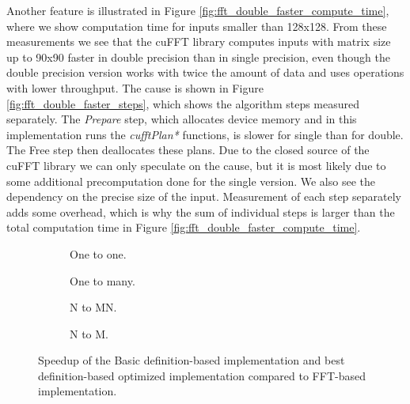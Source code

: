 Another feature is illustrated in Figure \ref{fig:fft_double_faster_compute_time}, where we show computation time for inputs smaller than 128x128. From these measurements we see that the cuFFT library computes inputs with matrix size up to 90x90
faster in double precision than in single precision, even though the  double precision version works with twice the amount of data and uses operations with lower throughput. The cause is shown in Figure \ref{fig:fft_double_faster_steps}, which shows the algorithm steps measured separately. The \textit{Prepare} step, which allocates device memory and in this implementation runs the \textit{cufftPlan*} functions, is slower for single than for double. The Free step then deallocates these plans. Due to the closed source of the cuFFT library we can only speculate on the cause, but it is most likely due to some additional precomputation done for the single version. We also see the dependency on the precise size of the input. Measurement of each step separately adds some overhead, which is why the sum of individual steps is larger than the total computation time in Figure \ref{fig:fft_double_faster_compute_time}.



\begin{figure}[ht]
	\centering	
	\begin{subfigure}{0.35\textwidth}
		\centering
		\def\svgwidth{\textwidth}
		
		\caption{One to one.}
		\label{fig:fft_speedup_one_to_one}
	\end{subfigure}
	\begin{subfigure}{0.35\textwidth}
		\centering
		\def\svgwidth{\textwidth}
		
		\caption{One to many.}
		\label{fig:fft_speedup_one_to_many}
	\end{subfigure}
	\begin{subfigure}{0.35\textwidth}
		\centering
		\def\svgwidth{\textwidth}
		
		\caption{N to MN.}
		\label{fig:fft_speedup_n_to_mn}
	\end{subfigure}
	\begin{subfigure}{0.35\textwidth}
		\centering
		\def\svgwidth{\textwidth}
		
		\caption{N to M.}
		\label{fig:fft_speedup_n_to_m}
	\end{subfigure}
	\caption{Speedup of the Basic definition-based implementation and best definition-based optimized implementation compared to FFT-based implementation.}
	\label{fig:fft_speedup}
\end{figure}

